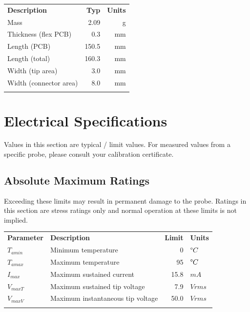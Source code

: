 \documentclass[11pt]{article}
\newcommand{\thinhline}{\Xhline{1\arrayrulewidth}}
\newcommand{\thickhline}{\Xhline{2.5\arrayrulewidth}}
\begin{document}
\begin{tabularx}{10cm}{Xrr}
\thickhline
\textbf{Description} & \textbf{Typ} & \textbf{Units} \\
\thickhline
Mass & 2.09 & g\\
\thinhline
Thickness (flex PCB) & 0.3 & mm\\
\thinhline
Length (PCB) & 150.5 & mm\\
\thinhline
Length (total) & 160.3 & mm\\
\thinhline
Width (tip area) & 3.0 & mm\\
\thinhline
Width (connector area) & 8.0 & mm\\
\thickhline
\end{tabularx}

\pagebreak
\section{Electrical Specifications}

Values in this section are typical / limit values. For measured values from a specific probe, please consult your
calibration certificate.


\subsection{Absolute Maximum Ratings}

Exceeding these limits may result in permanent damage to the probe. Ratings in this section are stress ratings only and
normal operation at these limits is not implied.

\begin{tabularx}{12cm}{lXrl}
\thickhline
\textbf{Parameter} & \textbf{Description} & \textbf{Limit} & \textbf{Units} \\
\thickhline
$T_{amin}$ & Minimum temperature & 0 & $ \degree C$ \\
\thinhline
$T_{amax}$ & Maximum temperature & 95 & $ \degree C$ \\
\thinhline
$I_{max}$ & Maximum sustained current & 15.8 & $ mA $ \\
\thinhline
$V_{maxT}$ & Maximum sustained tip voltage & 7.9 & $ Vrms $ \\
\thinhline
$V_{maxV}$ & Maximum instantaneous tip voltage & 50.0 & $ Vrms $ \\
\thickhline
\end{tabularx}
\end{document}
